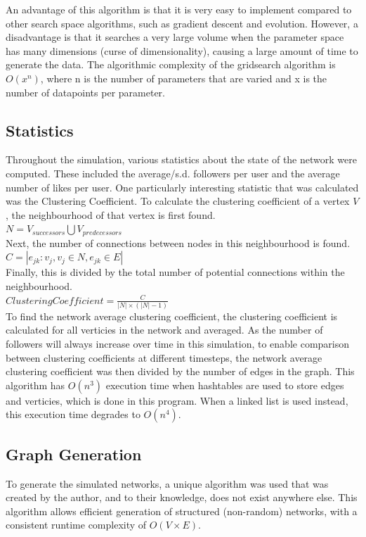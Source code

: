 \documentclass{article}
\begin{document}
An advantage of this algorithm is that it is very easy to implement compared to
other search space algorithms, such as gradient descent and evolution.
However, a disadvantage is that it searches a very large volume when the parameter
space has many dimensions (curse of dimensionality), causing a large amount of
time to generate the data. The algorithmic complexity of the gridsearch algorithm
is $O(x^n)$, where n is the number of parameters that are varied and x is the number
of datapoints per parameter.

\subsection{Statistics}
Throughout the simulation, various statistics about the state of the network were
computed. These included the average/s.d. followers per user and the average number of likes
per user.
One particularly interesting statistic that was calculated was the Clustering Coefficient.
To calculate the clustering coefficient of a vertex $V$, the neighbourhood of that
vertex is first found.\\
$N = V_{successors} \bigcup V_{predecessors}$\\
Next, the number of connections between nodes in this neighbourhood is found.\\
$C = |{e_{jk} : v_j, v_j \in N, e_{jk} \in E}|$\\
Finally, this is divided by the total number of potential connections within the neighbourhood.\\
$\mathit{Clustering Coefficient} = \frac{C}{|N| \times (|N| - 1)}$\\
To find the network average clustering coefficient, the clustering coefficient
is calculated for all verticies in the network and averaged.
As the number of followers will always increase over time in this simulation,
to enable comparison between clustering coefficients at different timesteps,
the network average clustering coefficient was then divided by the number
of edges in the graph.
This algorithm has $O\left(n^3\right)$ execution time when hashtables are used to store
edges and verticies, which is done in this program.
When a linked list is used instead, this execution time degrades to $O\left(n^4\right)$.

\subsection{Graph Generation}

To generate the simulated networks, a unique algorithm was used
that was created by the author, and to their knowledge, does not exist anywhere else.
This algorithm allows efficient generation of structured (non-random) networks,
with a consistent runtime complexity of $O\left(V \times E\right)$.
\end{document}
